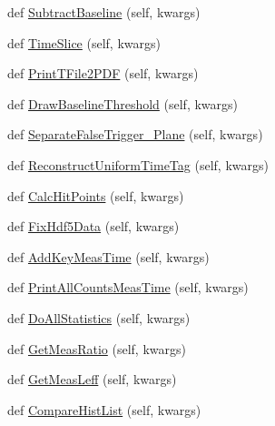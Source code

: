 \begin{DoxyCompactItemize}
\item 
def \hyperlink{classMIS_1_1DataFactory_1_1DataManager_1_1DataManager_a80a5219e66292889b6d175e55bcc061b}{Subtract\+Baseline} (self, kwargs)
\item 
def \hyperlink{classMIS_1_1DataFactory_1_1DataManager_1_1DataManager_abbe5b934a12b8f7f1c47148a9a81e682}{Time\+Slice} (self, kwargs)
\item 
def \hyperlink{classMIS_1_1DataFactory_1_1DataManager_1_1DataManager_ad2b0a6b803cdf96223b02e81a466c867}{Print\+T\+File2\+P\+DF} (self, kwargs)
\item 
def \hyperlink{classMIS_1_1DataFactory_1_1DataManager_1_1DataManager_af4b7bfe87e9f8e5ee7145aabd4ccab7b}{Draw\+Baseline\+Threshold} (self, kwargs)
\item 
def \hyperlink{classMIS_1_1DataFactory_1_1DataManager_1_1DataManager_a3e82281475c60ff354baa6388ddc2f61}{Separate\+False\+Trigger\+\_\+\+Plane} (self, kwargs)
\item 
def \hyperlink{classMIS_1_1DataFactory_1_1DataManager_1_1DataManager_a2796158f69c164cb942f1c86d0d90d25}{Reconstruct\+Uniform\+Time\+Tag} (self, kwargs)
\item 
def \hyperlink{classMIS_1_1DataFactory_1_1DataManager_1_1DataManager_adb31511d2e5a9e7a2d954022e6c75f8b}{Calc\+Hit\+Points} (self, kwargs)
\item 
def \hyperlink{classMIS_1_1DataFactory_1_1DataManager_1_1DataManager_a527698e508175494049d1170eb263fea}{Fix\+Hdf5\+Data} (self, kwargs)
\item 
def \hyperlink{classMIS_1_1DataFactory_1_1DataManager_1_1DataManager_ad063fa32f8abfceb5b86f989d2d396bc}{Add\+Key\+Meas\+Time} (self, kwargs)
\item 
def \hyperlink{classMIS_1_1DataFactory_1_1DataManager_1_1DataManager_ad058ab22abd2771e354780c327e1466f}{Print\+All\+Counts\+Meas\+Time} (self, kwargs)
\item 
def \hyperlink{classMIS_1_1DataFactory_1_1DataManager_1_1DataManager_a810c3d0b5dc51f5971a185963b74a5bb}{Do\+All\+Statistics} (self, kwargs)
\item 
def \hyperlink{classMIS_1_1DataFactory_1_1DataManager_1_1DataManager_aa7e32749944e05b564458a7b2213dbda}{Get\+Meas\+Ratio} (self, kwargs)
\item 
def \hyperlink{classMIS_1_1DataFactory_1_1DataManager_1_1DataManager_ae0d34077ea8e2aac7807b742b0231e9f}{Get\+Meas\+Leff} (self, kwargs)
\item 
def \hyperlink{classMIS_1_1DataFactory_1_1DataManager_1_1DataManager_a84a6c5a56d73c4c9e5a18bc22bbaa1d9}{Compare\+Hist\+List} (self, kwargs)

\end{DoxyCompactItemize}
